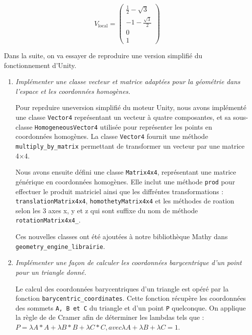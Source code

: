 \documentclass[a4paper,12pt]{article}
\begin{document}
\begin{enumerate}
      \[
      \boxed{
      V_{\text{local}} =
      \begin{pmatrix}
      \frac{1}{2} - \sqrt{3} \\
      -1 - \frac{\sqrt{3}}{2} \\
      0 \\
      1
      \end{pmatrix}
      }
      \]

\end{enumerate}

\label{exo:impl}

Dans la suite, on va essayer de reproduire une version simplifié du fonctionnement d'Unity. 

\begin{enumerate}
  \item \emph{Implémenter une classe vecteur et matrice adaptées pour la géométrie dans l'espace et les coordonnées homogènes.}

  Pour reprduire uneversion simplifié du moteur Unity, nous avons implémenté une classe \texttt{Vector4} représentant un vecteur à quatre composantes, et sa sous-classe \texttt{HomogeneousVector4} utilisée pour représenter les points en coordonnées homogènes. La classe \texttt{Vector4} fournit une méthode \texttt{multiply\_by\_matrix} permettant de transformer un vecteur par une matrice 4×4.

  Nous avons ensuite défini une classe \texttt{Matrix4x4}, représentant une matrice générique en coordonnées homogènes. Elle inclut une méthode \texttt{prod} pour effectuer le produit matriciel ainsi que les diffréntes transformations : \texttt{translationMatrix4x4}, \texttt{homothetyMatrix4x4} et les méthodes de roation selon les 3 axes x, y et z qui sont suffixe du nom de méthode \texttt{rotationMatrix4x4\_}.  

  Ces nouvelles classes ont été ajoutées à notre bibliothèque Mathy dans \newline \texttt{geometry\_engine\_librairie}. \newline
  

  \item \emph{Implémenter une façon de calculer les coordonnées barycentrique d'un point pour un triangle donné.}

  Le calcul des coordonnées barycentriques d'un triangle est opéré par la fonction \texttt{barycentric\_coordinates}. Cette fonction récupère les coordonnées des sommets \texttt{A, B et C} du triangle et d'un point \texttt{P} quelconque. On applique la règle de de Cramer afin de déterminer les lambdas tels que : \(P = \lambda A * A + \lambda B * B + \lambda C * C, avec \lambda A + \lambda B + \lambda C = 1\).\newline


\end{enumerate}
\end{document}

